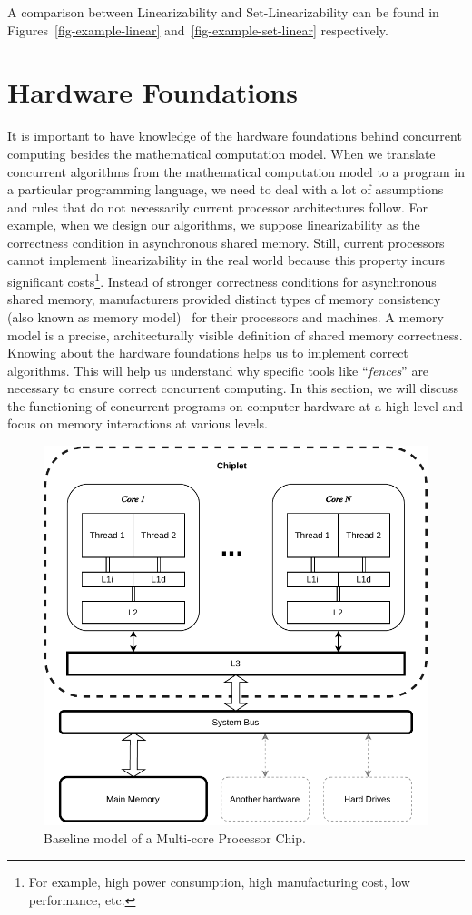 A comparison between Linearizability and Set-Linearizability can be found in Figures~\ref{fig-example-linear} and~\ref{fig-example-set-linear} respectively.

\section{\label{sec:hardware-foundations}Hardware Foundations}

It is important to have knowledge of the hardware foundations behind concurrent computing besides the mathematical computation model. When we translate concurrent algorithms from the mathematical computation model to a program in a particular programming language, we need to deal with a lot of assumptions and rules that do not necessarily current processor architectures follow. For example, when we design our algorithms, we suppose linearizability as the correctness condition in asynchronous shared memory. Still, current processors cannot implement linearizability in the real world because this property incurs significant costs\footnote{For example, high power consumption, high manufacturing cost, low performance, etc.}. Instead of stronger correctness conditions for asynchronous shared memory, manufacturers provided distinct types of memory consistency (also known as memory model)~\cite{DBLP_series_synthesis_2020Nagarajan, DBLP_series_synthesis_2013Scott} for their processors and machines. A memory model is a precise, architecturally visible definition of shared memory correctness. Knowing about the hardware foundations helps us to implement correct algorithms. This will help us understand why specific tools like ``\emph{fences}'' are necessary to ensure correct concurrent computing. In this section, we will discuss the functioning of concurrent programs on computer hardware at a high level and focus on memory interactions at various levels.

\begin{figure}[ht!]
    \centering
    \includegraphics[width=0.7\linewidth]{contents//figures/III_2_cpu.pdf}
    \caption{Baseline model of a Multi-core Processor Chip.}
    \label{fig:multi-core-processor}
\end{figure}

